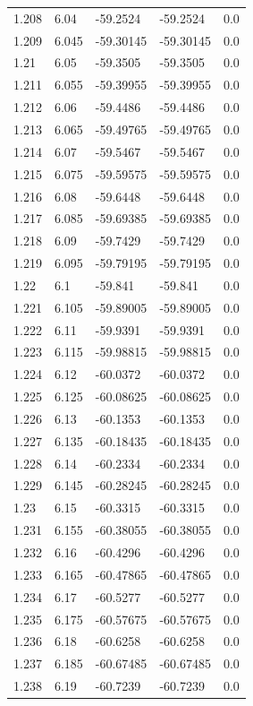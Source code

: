 \begin{tabular}{lllll}
1.208 & 6.04 & -59.2524 & -59.2524 & 0.0 \\
1.209 & 6.045 & -59.30145 & -59.30145 & 0.0 \\
1.21 & 6.05 & -59.3505 & -59.3505 & 0.0 \\
1.211 & 6.055 & -59.39955 & -59.39955 & 0.0 \\
1.212 & 6.06 & -59.4486 & -59.4486 & 0.0 \\
1.213 & 6.065 & -59.49765 & -59.49765 & 0.0 \\
1.214 & 6.07 & -59.5467 & -59.5467 & 0.0 \\
1.215 & 6.075 & -59.59575 & -59.59575 & 0.0 \\
1.216 & 6.08 & -59.6448 & -59.6448 & 0.0 \\
1.217 & 6.085 & -59.69385 & -59.69385 & 0.0 \\
1.218 & 6.09 & -59.7429 & -59.7429 & 0.0 \\
1.219 & 6.095 & -59.79195 & -59.79195 & 0.0 \\
1.22 & 6.1 & -59.841 & -59.841 & 0.0 \\
1.221 & 6.105 & -59.89005 & -59.89005 & 0.0 \\
1.222 & 6.11 & -59.9391 & -59.9391 & 0.0 \\
1.223 & 6.115 & -59.98815 & -59.98815 & 0.0 \\
1.224 & 6.12 & -60.0372 & -60.0372 & 0.0 \\
1.225 & 6.125 & -60.08625 & -60.08625 & 0.0 \\
1.226 & 6.13 & -60.1353 & -60.1353 & 0.0 \\
1.227 & 6.135 & -60.18435 & -60.18435 & 0.0 \\
1.228 & 6.14 & -60.2334 & -60.2334 & 0.0 \\
1.229 & 6.145 & -60.28245 & -60.28245 & 0.0 \\
1.23 & 6.15 & -60.3315 & -60.3315 & 0.0 \\
1.231 & 6.155 & -60.38055 & -60.38055 & 0.0 \\
1.232 & 6.16 & -60.4296 & -60.4296 & 0.0 \\
1.233 & 6.165 & -60.47865 & -60.47865 & 0.0 \\
1.234 & 6.17 & -60.5277 & -60.5277 & 0.0 \\
1.235 & 6.175 & -60.57675 & -60.57675 & 0.0 \\
1.236 & 6.18 & -60.6258 & -60.6258 & 0.0 \\
1.237 & 6.185 & -60.67485 & -60.67485 & 0.0 \\
1.238 & 6.19 & -60.7239 & -60.7239 & 0.0 \\

\end{tabular}
